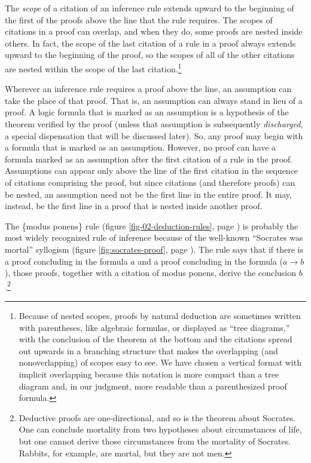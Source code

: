The \emph{scope} of a
citation
of an inference rule
extends upward to the beginning of the first of the proofs
above the line that the rule requires.
The scopes of citations in a proof can overlap,
and when they do, some proofs are nested inside others.
In fact, the scope of the last citation of a rule in a proof
always extends upward to the beginning of the proof,
so the scopes of all of the other citations are nested
within the scope of the last citation.\footnote{Because
of nested scopes,
proofs by natural deduction
are sometimes written with parentheses,
like algebraic formulas,
or displayed as ``tree diagrams,''
with the conclusion of the theorem at the bottom and
the citations spread out upwards
in a branching structure
that makes the overlapping (and nonoverlapping)
of scopes easy to see.
We have chosen a vertical format with implicit
overlapping because this notation is more compact than a
tree
diagram and, in our judgment,
more readable than a parenthesized proof formula.}

Wherever an inference rule requires a proof above the line,
an assumption can take the place of that proof.
That is,
an assumption can always stand in lieu of a proof.
A logic formula that is marked as an assumption
is a hypothesis of the theorem verified by the proof
(unless that assumption is subsequently \emph{discharged},
a special dispensation
that will be discussed later).
So, any proof may begin with a formula
that is marked as an assumption.
However, no proof can have
a formula marked as an assumption after
the first citation of a rule in the proof.
Assumptions
can appear only above the line
of the first citation in the sequence of citations
comprising the proof, but since citations
(and therefore proofs) can be nested,
an assumption need not be the first line in
the entire proof.
It may, instead, be the first line
in a proof that is nested inside another proof.

The \{modus ponens\} rule
(figure \ref{fig-02-deduction-rules}, page \pageref{fig-02-deduction-rules})
is probably the most widely recognized rule of inference because
of the well-known ``Socrates was mortal'' syllogism
(figure \ref{fig:socrates-proof}, page \pageref{fig:socrates-proof}).
The rule says that if there is a proof concluding in
the formula $a$ and a proof concluding in the formula ($a \rightarrow b$),
those proofs, together with a citation of modus ponens,
derive the conclusion $b$.\footnote{Deductive
proofs are one-directional,
and so is the theorem about Socrates.
One can conclude mortality from two hypotheses about circumstances of life,
but one cannot derive those circumstances from the mortality of Socrates.
Rabbits, for example, are mortal, but they are not men.}

